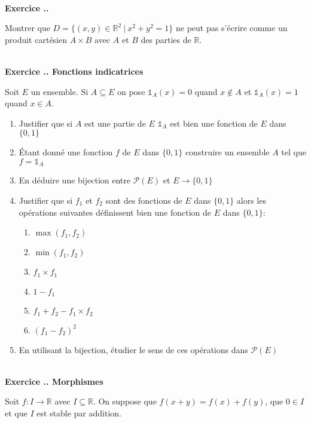 \documentclass{article}
\newcommand{\mb}[1]{\mathbb{#1}}
\newcounter{exo}
\newcommand{\exercice}[1][\null]{\textbf{\\ Exercice \thesection.\theexo. #1} \addtocounter{exo}{1}}
\begin{document}
\exercice 

Montrer que $D = \{ (x,y) \in \mb{R}^2 ~|~ x^2 + y^2 = 1 \}$
ne peut pas s'écrire comme un produit cartésien $A \times B$
avec $A$ et $B$ des parties de $\mb{R}$.


\exercice[Fonctions indicatrices]

Soit $E$ un ensemble. Si $A \subseteq E$ on pose 
$\mathds{1}_A (x) = 0$ quand $x \not \in A$ et $\mathds{1}_A (x) = 1$ 
quand $x \in A$.

\begin{enumerate}
    \item Justifier que si $A$ est une partie de $E$
        $\mathds{1}_A$ est bien une fonction de $E$ dans $\{ 0, 1 \}$

    \item Étant donné une fonction $f$ de $E$ dans $\{ 0, 1 \}$
        construire un ensemble $A$ tel que $f = \mathds{1}_A$

    \item En déduire une bijection entre $\mathcal{P}(E)$
        et $E \to \{ 0, 1 \}$

    \item Justifier que si $f_1$ et $f_2$ sont des 
        fonctions de $E$ dans $\{0,1\}$ alors 
        les opérations suivantes définissent bien 
        une fonction de $E$ dans $\{ 0, 1\}$:


        \begin{multicols}{2}
            \begin{enumerate}
                \item $\max (f_1, f_2)$
                \item $\min (f_1, f_2)$
                \item $f_1 \times f_1$
                \item $1 - f_1$
                \item $f_1 + f_2 - f_1 \times f_2$
                \item $(f_1 - f_2)^2$
            \end{enumerate}
        \end{multicols}


    \item En utilisant la bijection, étudier 
        le sens de ces opérations dans $\mathcal{P}(E)$
\end{enumerate}

\exercice[Morphismes]

Soit $f : I \to \mb{R}$ avec $I \subseteq \mb{R}$.
On suppose que $f(x + y) = f (x) + f(y)$,
que $0 \in I$ et que $I$ est stable par addition.
\end{document}
